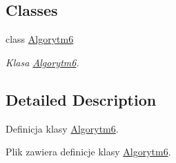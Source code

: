 \subsection*{Classes}
\begin{DoxyCompactItemize}
\item 
class \hyperlink{a00007}{Algorytm6}
\begin{DoxyCompactList}\small\item\em Klasa \hyperlink{a00007}{Algorytm6}. \end{DoxyCompactList}\end{DoxyCompactItemize}


\subsection{Detailed Description}
Definicja klasy \hyperlink{a00007}{Algorytm6}. 

Plik zawiera definicje klasy \hyperlink{a00007}{Algorytm6}. 